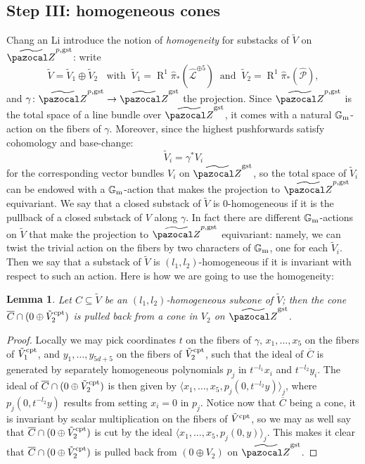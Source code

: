 \documentclass[11pt]{amsart}
\renewcommand{\to}{\rightarrow}
\newcommand{\hL}{\widehat{\mathcal L}}
\newcommand{\tZ}{\widetilde{\pazocal Z}}
\newcommand{\R}{\operatorname{R}}
\newcommand{\Gm}{\mathbb{G}_{\rm{m}}}
\theoremstyle{plain}
\newtheorem{lem}[thm]{Lemma}
\theoremstyle{definition}
\begin{document}
 \subsection*{Step III: homogeneous cones}
Chang an Li introduce the notion of \emph{homogeneity} for substacks of $\tilde V$ on $\tZ^{p,\rm{gst}}$: write 
\[\tilde V=\tilde V_1\oplus\tilde V_2\;\;\text{ with} \;\;\tilde V_1=\R^1\hat{\pi}_*(\hL^{\oplus 5})\;\; \text{and}\;\; \tilde V_2=\R^1\hat{\pi}_*(\widehat{\mathcal P}),\]
 and $\gamma\colon \tZ^{p,\rm{gst}}\to\tZ^{\rm{gst}}$ the projection. Since $\tZ^{p,\rm{gst}}$ is the total space of a line bundle over $\tZ^{\rm{gst}}$, it comes with a natural $\Gm$-action on the fibers of $\gamma$. Moreover, since the highest pushforwards satisfy cohomology and base-change:
 \[\tilde V_i=\gamma^*V_i\]
 for the corresponding vector bundles $V_i$ on $\tZ^{\rm{gst}}$, so the total space of $\tilde V_i$ can be endowed with a $\Gm$-action that makes the projection to $\tZ^{p,\rm{gst}}$ equivariant. We say that a closed substack of $\tilde V$ is $0$-homogeneous if it is the pullback of a closed substack of $V$ along $\gamma$. In fact there are different $\Gm$-actions on $\tilde V$ that make the projection to $\tZ^{p,\rm{gst}}$ equivariant: namely, we can twist the trivial action on the fibers by two characters of $\Gm$, one for each $\tilde V_i$. Then we say that a substack of $\tilde V$ is $(l_1,l_2)$-homogeneous if it is invariant with respect to such an action. Here is how we are going to use the homogeneity:

\begin{lem}
 Let $C\subseteq \tilde V$ be an $(l_1,l_2)$-homogeneous sub\emph{cone} of $\tilde V$; then the cone $\overline{C}\cap(0\oplus\tilde V_2^{\rm{cpt}})$ is pulled back from a cone in $V_2$ on $\tZ^{\rm{gst}}$.
\end{lem}
\begin{proof}
 Locally we may pick coordinates $t$ on the fibers of $\gamma$, $x_1,\ldots,x_5$ on the fibers of $\tilde V_1^{\rm{cpt}}$, and $y_1,\ldots,y_{5d+5}$ on the fibers of $\tilde V_2^{\rm{cpt}}$, such that the ideal of $\overline{C}$ is generated by separately homogeneous polynomials $p_j$ in $t^{-l_1}x_i$ and $t^{-l_2}y_i$. The ideal of $\overline{C}\cap(0\oplus\tilde V_2^{\rm{cpt}})$ is then given by $\langle x_1,\ldots, x_5,p_j(0,t^{-l_2}y)\rangle_j$, where $p_j(0,t^{-l_2}y)$ results from setting $x_i=0$ in $p_j$. Notice now that $\overline{C}$ being a cone, it is invariant by scalar multiplication on the fibers of $\tilde V^{\rm{cpt}}$, so we may as well say that $\overline{C}\cap(0\oplus\tilde V_2^{\rm{cpt}})$ is cut by the ideal $\langle x_1,\ldots, x_5,p_j(0,y)\rangle_j$. This makes it clear that $\overline{C}\cap(0\oplus\tilde V_2^{\rm{cpt}})$ is pulled back from $(0\oplus V_2)$ on $\tZ^{\rm{gst}}$.
\end{proof}
\end{document}
